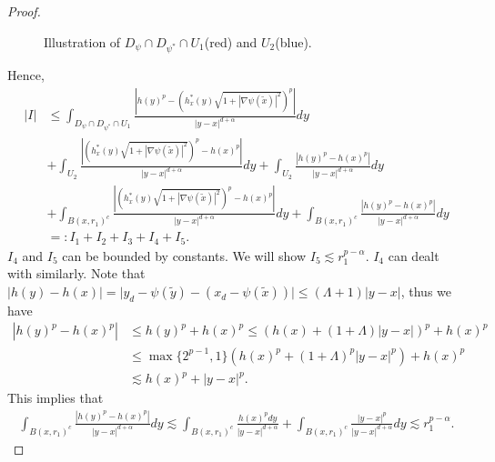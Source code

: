 \documentclass[12pt,a4paper]{amsart}
\numberwithin{equation}{section}
\theoremstyle{plain}
\newcommand{\wt}{\widetilde}
\newcommand{\1}{\mathbbm{1}}
\begin{document}
\begin{proof}
\begin{center}
\begin{figure}
\caption{Illustration of $D_{\psi} \cap D_{\psi^*} \cap U_1$(red) and $U_2$(blue).}
\label{figure:partition}
\end{figure}
\end{center}
Hence,
\begin{align*}
|I| & \le \int_{D_{\psi} \cap D_{\psi^*} \cap U_1} \frac{|h(y)^p - (h_x^*(y)\sqrt{1+|\nabla \psi(\wt x)|^2})^p|}{|y-x|^{d+\alpha}}dy \\
& + \int_{U_2} \frac{|(h_x^*(y)\sqrt{1+|\nabla \psi(\wt x)|^2})^p - h(x)^p|}{|y-x|^{d+\alpha}}dy+ \int_{U_2} \frac{|h(y)^p - h(x)^p|}{|y-x|^{d+\alpha}}dy \\
& + \int_{B(x,r_1)^c}\frac{|(h_x^*(y)\sqrt{1+|\nabla \psi(\wt x)|^2})^p - h(x)^p|}{|y-x|^{d+\alpha}}dy + \int_{B(x,r_1)^c}\frac{|h(y)^p - h(x)^p|}{|y-x|^{d+\alpha}}dy \\
& =: I_1 + I_2 + I_3 + I_4 + I_5.
\end{align*}
$I_4$ and $I_5$ can be bounded by constants. 
We will show  $I_5 \lesssim r_1^{p-\alpha}$. $I_4$ can dealt with similarly.
Note that $|h(y)- h(x)| = \big|y_d - \psi(\wt y) - (x_d - \psi(\wt x))\big| \le (\Lambda + 1) |y - x|$, thus we have 
\begin{align*}
 |h(y)^p- h(x)^p|& \le h(y)^p + h(x)^p \le \left(h(x) + (1+\Lambda) |y-x|\right)^p + h(x)^p \\
 & \le \max\{2^{p-1}, 1\}\left(h(x)^p + (1+\Lambda)^p |y-x|^p\right) + h(x)^p \\
 & \lesssim h(x)^p + |y-x|^p.
\end{align*}
This implies that
\begin{align}\label{non-singular argument}
\int_{B(x,r_1)^c}\frac{|h(y)^p - h(x)^p|}{|y-x|^{d+\alpha}}dy \lesssim  \int_{B(x,r_1)^c} \frac{h(x)^p dy}{|y-x|^{d+\alpha}} + \int_{B(x,r_1)^c}\frac{|y-x|^p}{|y-x|^{d+\alpha}}dy\lesssim r_1^{p-\alpha}.
\end{align}


\end{proof}
\end{document}
